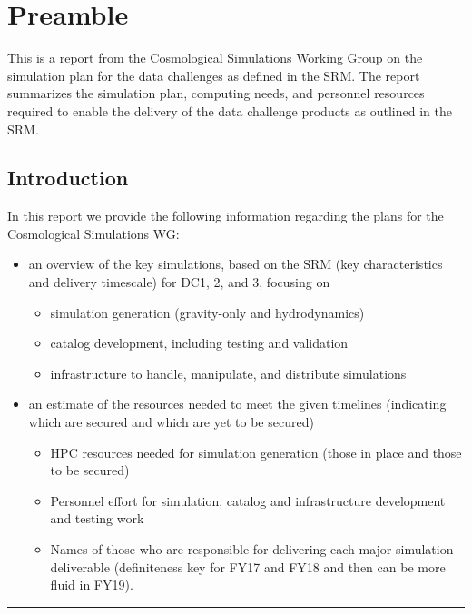 \section{Preamble}
\resetnumbering
\label{sec:preamble}

This is a report from the Cosmological Simulations Working Group on the simulation plan for the data challenges as defined in the SRM. The report summarizes the simulation plan, computing needs, and personnel resources required to enable the delivery of the data challenge products as outlined in the SRM.

\vspace{\baselineskip}




\subsection{Introduction}
\label{sec:preamble:introduction}

In this report we provide the following information regarding the plans for the Cosmological Simulations WG:

\begin{itemize}
   \item    an overview of the key simulations, based on the SRM (key characteristics and delivery timescale) for DC1, 2, and 3, focusing on
     \begin{itemize}
        \item        simulation generation (gravity-only and hydrodynamics)
        \item        catalog development, including testing and validation
        \item        infrastructure to handle, manipulate, and distribute simulations
     \end{itemize}
   \item    an estimate of the resources needed to meet the given timelines (indicating which are secured and which are yet to be secured)
     \begin{itemize}
        \item        HPC resources needed for simulation generation (those in place and those to be secured)
        \item        Personnel effort for simulation, catalog and infrastructure development and testing work
        \item        Names of those who are responsible for delivering each major simulation deliverable (definiteness key for FY17 and FY18 and then can be more fluid in FY19).
     \end{itemize}
\end{itemize}


\vspace{\baselineskip}
\hrule
\clearpage
